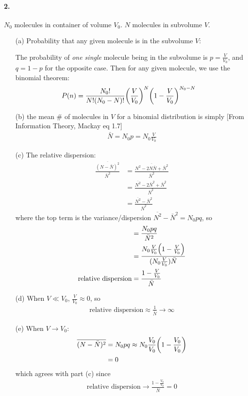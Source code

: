 \documentclass[../main.tex]{subfiles}
\begin{document}
\paragraph*{2.} $N_0$ molecules in container of volume $V_0$. $N$ molecules in subvolume $V$.
\begin{itemize}
    \item [(a)]
    Probability that any given molecule is in the subvolume $V$:

    The probability of \textit{one single} molecule being in the subvolume is $p = \frac{V}{V_0}$, and $q = 1 - p$ for the opposite case.
    Then for any given molecule, we use the binomial theorem:
    \begin{align*}
        P(n) &= \frac{N_0!}{N!(N_0 - N)!} \qt(\frac{V}{V_0})^N \qt(1 - \frac{V}{V_0})^{N_0 - N}
    \end{align*}
    \item [(b)] the mean \# of molecules in $V$ for a binomial distribution is simply [From Information Theory, Mackay eq 1.7]
    \begin{align*}
        \bar N = N_0 p = N_0 \frac{V}{V_0}
    \end{align*}
    \item [(c)] The relative dispersion:
    \begin{align*}
        \frac{\overline{(N - \bar N)^2}}{\bar N^2} &= \frac{\overline{N^2 - 2N\bar N + \bar N^2}}{\bar N^2} \\
        &= \frac{\overline{N^2} - 2\bar N^2 + \bar N^2}{\bar N^2} \\
        &= \frac{\overline{N^2} - \bar N^2}{\bar N^2}
    \end{align*}
    where the top term is the variance/dispersion $\overline{N^2} - \bar N^2 = N_0pq$, so
    \begin{align*}
        &= \frac{N_0pq}{\bar N^2} \\
        &= \frac{N_0\frac{V}{V_0}\qt(1 - \frac{V}{V_0})}{(N_0\frac{V}{V_0}) \bar N} \\
        \textrm{relative dispersion} &= \frac{1 - \frac{V}{V_0}}{\bar N}
    \end{align*}
    \item [(d)] When $V \ll V_0$, $\frac{V}{V_0} \approx 0$, so
    \begin{align*}
        \textrm{relative dispersion} \approx \frac{1}{\bar N} \to \infty
    \end{align*}
    \item [(e)] When $V \to V_0$:
    \begin{align*}
        \overline{(N - \bar N)^2} &= N_0pq \approx N_0 \frac{V_0}{V_0} \qt(1 - \frac{V_0}{V_0}) \\
        &= 0
    \end{align*}
    which agrees with part (c) since
    \begin{align*}
        \textrm{relative dispersion} \to \frac{1 - \frac{V_0}{V_0}}{\bar N} = 0
    \end{align*}
\end{itemize}
\end{document}
